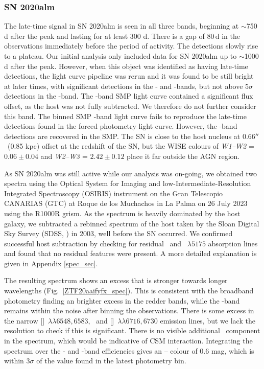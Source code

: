 \documentclass[a4paper,oneside,12pt, class=Latex/Classes/PhDthesisPSnPDF, crop=false]{standalone}
\begin{document}
\subsubsection*{SN 2020alm}
The late-time signal in SN 2020alm is seen in all three bands, beginning at $\sim$750\,d after the peak and lasting for at least 300 d. There is a gap of 80\,d in the observations immediately before the period of activity. The detections slowly rise to a plateau. Our initial analysis only included data for SN 2020alm up to $\sim$1000\,d after the peak. However, when this object was identified as having late-time detections, the light curve pipeline was rerun and it was found to be still bright at later times, with significant detections in the \ztfr- and \ztfi-bands, but not above 5$\sigma$ detections in the \ztfg-band. The \ztfi-band SMP light curve contained a significant flux offset, as the host was not fully subtracted. We therefore do not further consider this band. The binned SMP \ztfr-band light curve fails to reproduce the late-time detections found in the forced photometry light curve. However, the \ztfg-band detections are recovered in the SMP. The SN is close to the host nucleus at 0.66$^{\prime\prime}$~(0.85 kpc) offset at the redshift of the SN, but the WISE colours of \textit{W1--W2} = $0.06\pm0.04$ and \textit{W2--W3} = $2.42\pm0.12$ place it far outside the AGN region. 

As SN 2020alm was still active while our analysis was on-going, we obtained two spectra using the Optical System for Imaging and low-Intermediate-Resolution Integrated Spectroscopy (OSIRIS) instrument on the Gran Telescopio CANARIAS (GTC) at Roque de los Muchachos in La Palma on 26 July 2023 using the R1000R grism. As the spectrum is heavily dominated by the host galaxy, we subtracted a rebinned spectrum of the host taken by the Sloan Digital Sky Survey (SDSS, \citealt{SDSS-I-II, SDSS_DR4, SDSS_telescope, SDSS_Spectograph}) in 2003, well before the SN occurred. We confirmed successful host subtraction by checking for residual \NaID~and \MgI~${\lambda5175}$ absorption lines and found that no residual features were present. A more detailed explanation is given in Appendix \ref{spec_sec}.

The resulting spectrum shows an excess that is stronger towards longer wavelengths (Fig.~\ref{ZTF20aaifyfx_spec}). This is consistent with the broadband photometry finding an brighter excess in the redder bands, while the \ztfg-band remains within the noise after binning the observations. There is some excess in the narrow [\NII]~${\lambda\lambda6548,6583}$, \Halpha~and [\SII]~$ {\lambda\lambda6716, 6730}$ emission lines, but we lack the resolution to check if this is significant. There is no visible additional \Halpha~component in the spectrum, which would be indicative of CSM interaction. Integrating the spectrum over the \ztfr- and \ztfi-band efficiencies gives an \ztfr -- \ztfi colour of 0.6 mag, which is within $3\sigma$ of the value found in the latest photometry bin.
\end{document}

